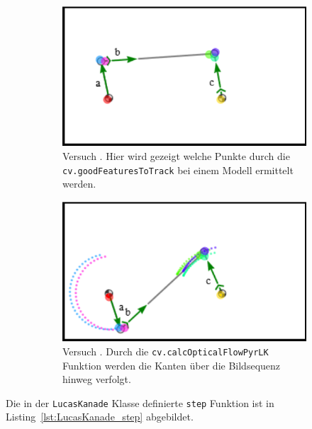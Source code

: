 \begin{figure}
    \centering
    \begin{subfigure}[t]{0.45\textwidth}
        \includegraphics[width=\textwidth]{gfx/lucas_kanade_simple.png}
        \caption{Versuch . Hier wird gezeigt welche Punkte durch die \lstinline{cv.goodFeaturesToTrack} bei einem  Modell ermittelt werden.}\label{fig:opticalflow2_1}
    \end{subfigure}
    \begin{subfigure}[t]{0.45\textwidth}
        \includegraphics[width=\textwidth]{gfx/lucas_kanade_history.png}
        \caption{Versuch . Durch die \lstinline{cv.calcOpticalFlowPyrLK} Funktion werden die Kanten über die Bildsequenz hinweg verfolgt.}\label{fig:opticalflow2_2}
    \end{subfigure}
    \caption[Versuche  und ]{}
    \label{fig:opticalflow2_1_2}
\end{figure}

Die in der \lstinline{LucasKanade} Klasse definierte \lstinline{step} Funktion ist in Listing~\ref{lst:LucasKanade_step} abgebildet.

